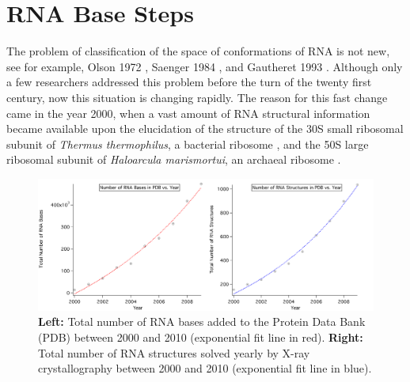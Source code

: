 \chapter{RNA Base Steps}
\label{basesteps} 

The problem of classification of the space of conformations
of RNA  is not  new, see for  example, Olson  1972 \cite{olson1_1972},
Saenger     1984     \cite{saenger1984},     and    Gautheret     1993
\cite{gautheret1993}.  Although only  a few researchers addressed this
problem  before  the  turn  of  the twenty  first  century,  now  this
situation is changing rapidly. The reason for this fast change came in
the year 2000, when a vast amount of RNA structural information became
available  upon the  elucidation of  the  structure of  the 30S  small
ribosomal  subunit  of   \textit{Thermus  thermophilus},  a  bacterial
ribosome  \cite{wimberly2000,  schluenzen2000},   and  the  50S  large
ribosomal subunit of \textit{Haloarcula marismortui}, an archaeal
ribosome \cite{ban2000}.
\begin{figure}[H]
\centering
\includegraphics[scale=0.36]{Chapter2/rna2000_2009copy.png}
\caption{\textbf{Left:} Total number of RNA bases added to the Protein
  Data  Bank (PDB)  between 2000  and  2010 (exponential  fit line  in
  red). \textbf{Right:}  Total number of RNA  structures solved yearly
  by X-ray crystallography between 2000 and 2010 (exponential fit line
  in blue).}
\label{fig:rnainpdb}
\end{figure}

